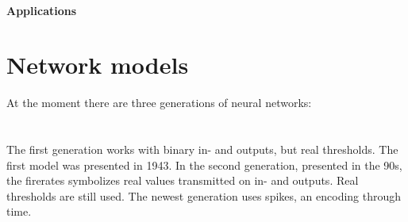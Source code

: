 \documentclass[10pt,a4paper,DIV=11]{scrreprt}
\begin{document}
\paragraph{Applications}






\section{Network models}
At the moment there are three generations of neural networks: \\


   \\
\\

The first generation works with binary in- and outputs, but real thresholds. The first model was presented in 1943.
In the second generation, presented in the 90s, the firerates symbolizes real values transmitted on in- and outputs. Real thresholds are still used.
The newest generation uses spikes, an encoding through time.
\end{document}
